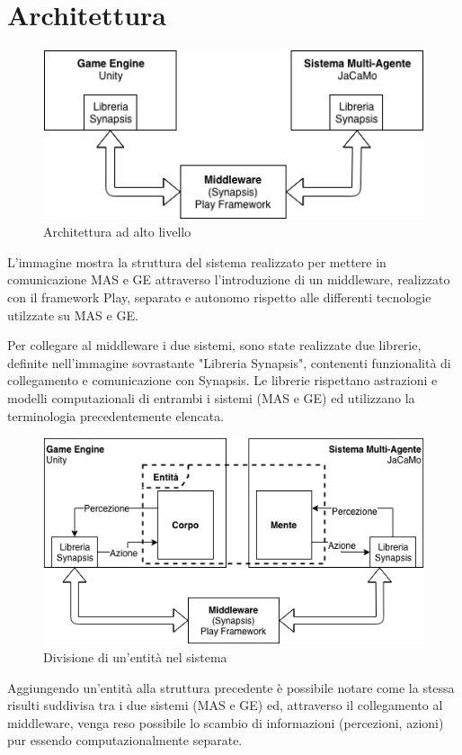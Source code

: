 \section{Architettura}

\begin{figure}[H]
   \centering
   \includegraphics[width=\linewidth]{figures/Architettura_alto_livello.png}
   \caption{Architettura ad alto livello}
\end{figure}

L'immagine mostra la struttura del sistema realizzato per mettere in comunicazione MAS e GE attraverso l'introduzione di un middleware, realizzato con il framework Play, separato e autonomo rispetto alle differenti tecnologie utilzzate su MAS e GE.

\medskip

Per collegare al middleware i due sistemi, sono state realizzate due librerie, definite nell'immagine sovrastante "Libreria Synapsis", contenenti funzionalità di collegamento e comunicazione con Synapsis.
Le librerie rispettano astrazioni e modelli computazionali di entrambi i sistemi (MAS e GE) ed utilizzano la terminologia precedentemente elencata.

\begin{figure}[H]
   \centering
   \includegraphics[width=\linewidth]{figures/Middleware_entity.png}
   \caption{Divisione di un'entità nel sistema}
\end{figure}

Aggiungendo un'entità alla struttura precedente è possibile notare come la stessa risulti suddivisa tra i due sistemi (MAS e GE) ed, attraverso il collegamento al middleware, venga reso possibile lo scambio di informazioni (percezioni, azioni) pur essendo computazionalmente separate.